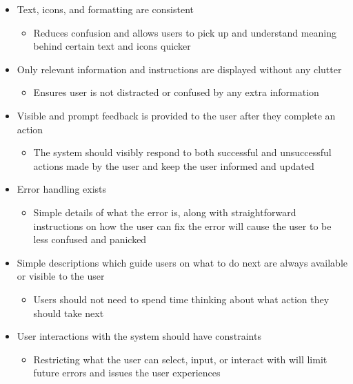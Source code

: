 \documentclass[12pt, titlepage]{article}
\begin{document}
\begin{itemize}
  \item Text, icons, and formatting are consistent
  \begin{itemize}
    \item Reduces confusion and allows users to pick up and understand meaning behind certain text and icons quicker
  \end{itemize}

  \item Only relevant information and instructions are displayed without any clutter
  \begin{itemize}
    \item Ensures user is not distracted or confused by any extra information
  \end{itemize}

  \item Visible and prompt feedback is provided to the user after they complete an action
  \begin{itemize}
    \item The system should visibly respond to both successful and unsuccessful actions made by the user and keep the user informed and updated
  \end{itemize}

  \item Error handling exists
  \begin{itemize}
    \item Simple details of what the error is, along with straightforward instructions on how the user can fix the error will cause the user to be less confused and panicked
  \end{itemize}

  \item Simple descriptions which guide users on what to do next are always available or visible to the user
  \begin{itemize}
    \item Users should not need to spend time thinking about what action they should take next
  \end{itemize}

  \item User interactions with the system should have constraints
  \begin{itemize}
    \item Restricting what the user can select, input, or interact with will limit future errors and issues the user experiences
  \end{itemize}
\end{itemize}
\end{document}

